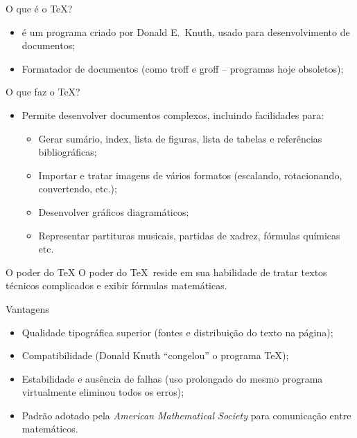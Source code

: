 
\begin{frame}{O que é o \TeX?}
\begin{itemize}
\item \prog{\TeX} é um programa criado por Donald E.~Knuth, usado para desenvolvimento de documentos;
\item Formatador de documentos (como troff e groff -- programas hoje obsoletos);
\end{itemize}
\end{frame}

\begin{frame}{O que faz o \TeX?}
\begin{itemize}
\item Permite desenvolver documentos complexos, incluindo facilidades
  para:
  \begin{itemize}
\item Gerar sumário, index, lista de figuras, lista de 
  tabelas e referências bibliográficas;
\item Importar e tratar imagens de vários formatos  (escalando, rotacionando, convertendo, etc.);
\item Desenvolver gráficos diagramáticos;
\item Representar partituras musicais, partidas de xadrez, fórmulas químicas etc.
\end{itemize}
\end{itemize}

\begin{block}{O poder do \TeX}
O poder do \TeX\ reside em sua habilidade de tratar textos técnicos complicados e exibir fórmulas matemáticas.
\end{block}
\end{frame}

\begin{frame}{Vantagens}
\begin{itemize}
\item Qualidade tipográfica superior (fontes e distribuição do texto
  na página);
\item Compatibilidade (Donald Knuth ``congelou'' o
  programa \TeX);
\item Estabilidade e ausência de falhas (uso prolongado \newline do mesmo programa virtualmente
  eliminou todos os erros);
\item Padrão adotado pela \emph{American Mathematical \newline Society} para
  comunicação entre matemáticos.
\end{itemize}
\end{frame}

